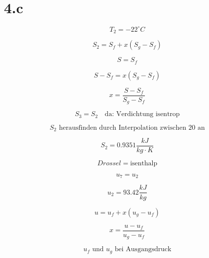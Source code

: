 \section*{4.c}

\[
T_2 = -22^\circ C
\]

\[
S_2 = S_f + x \left( S_{g} - S_{f} \right)
\]

\[
S = S_f
\]

\[
S - S_f = x \left( S_{g} - S_{f} \right)
\]

\[
x = \frac{S - S_f}{S_{g} - S_f}
\]

\[
S_3 = S_2 \quad \text{da: Verdichtung isentrop}
\]

\[
S_2 \text{ herausfinden durch Interpolation zwischen 20 an}
\]

\[
S_2 = 0.9351 \frac{kJ}{kg \cdot K}
\]

\[
Drossel = \text{isenthalp}
\]

\[
u_7 = u_2
\]

\[
u_2 = 93.42 \frac{kJ}{kg}
\]

\[
u = u_f + x \left( u_{g} - u_{f} \right)
\]

\[
x = \frac{u - u_f}{u_{g} - u_f}
\]

\[
u_f \text{ und } u_g \text{ bei Ausgangsdruck}
\]
